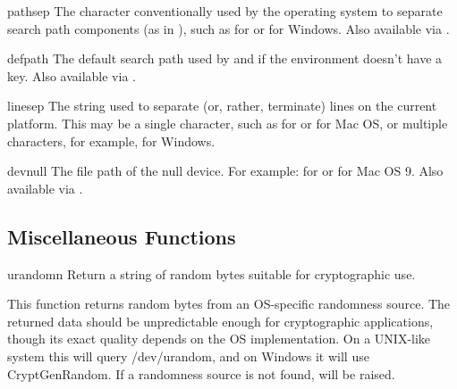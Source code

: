 \begin{datadesc}{pathsep}
The character conventionally used by the operating system to separate
search path components (as in ), such as \character{:} for
\POSIX{} or \character{;} for Windows.
Also available via .
\end{datadesc}

\begin{datadesc}{defpath}
The default search path used by  and
 if the environment doesn't have a 
key.
Also available via .
\end{datadesc}

\begin{datadesc}{linesep}
The string used to separate (or, rather, terminate) lines on the
current platform.  This may be a single character, such as  for \POSIX{} or  for Mac OS, or multiple characters,
for example,  for Windows.
\end{datadesc}

\begin{datadesc}{devnull}
The file path of the null device.
For example:  for \POSIX{} or  for
Mac OS 9.
Also available via .
\end{datadesc}


\subsection{Miscellaneous Functions \label{os-miscfunc}}

\begin{funcdesc}{urandom}{n}
Return a string of  random bytes suitable for cryptographic use.

This function returns random bytes from an OS-specific
randomness source.  The returned data should be unpredictable enough for
cryptographic applications, though its exact quality depends on the OS
implementation.  On a UNIX-like system this will query /dev/urandom, and
on Windows it will use CryptGenRandom.  If a randomness source is not
found,  will be raised.
\end{funcdesc}




